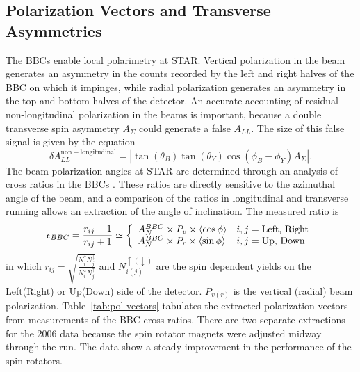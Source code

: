 
\subsection{Polarization Vectors and Transverse Asymmetries}

The BBCs enable local polarimetry at STAR.  Vertical polarization in the beam generates an asymmetry in the counts recorded by the left and right halves of the BBC on which it impinges, while radial polarization generates an asymmetry in the top and bottom halves of the detector.  An accurate accounting of residual non-longitudinal polarization in the beams is important, because a double transverse spin asymmetry \(A_{\Sigma}\) could generate a false \(A_{LL}\).  The size of this false signal is given by the equation
%
\begin{equation}
  \delta A_{LL}^{\mathrm{non-longitudinal}} = | \tan(\theta_B) \tan(\theta_Y) \cos(\phi_B - \phi_Y) A_{\Sigma} |.
  \label{eqn:pol-vector-uncertainty}
\end{equation}
%
The beam polarization angles at STAR are determined through an analysis of cross ratios in the BBCs \cite{Kiryluk:2005gg}.  These ratios are directly sensitive to the azimuthal angle of the beam, and a comparison of the ratios in longitudinal and transverse running allows an extraction of the angle of inclination.  The measured ratio is 
%
\begin{equation}
  \epsilon_{BBC} = \frac{r_{ij} -1}{r_{ij} + 1} \simeq \left\{
  \begin{array}{l l}
    A_N^{BBC} \times P_v \times \langle \cos \phi \rangle & i,j = \mbox{Left, Right} \\
    A_N^{BBC} \times P_r \times \langle \sin \phi \rangle & i,j = \mbox{Up, Down} \\
  \end{array} \right.
\end{equation}
%
in which \(r_{ij} = \sqrt{\frac{N_i^{\uparrow} N_j^{\downarrow}}{N_i^{\downarrow} N_j^{\uparrow}}}\) and \(N_{i(j)}^{\uparrow(\downarrow)}\) are the spin dependent yields on the Left(Right) or Up(Down) side of the detector. \(P_{v(r)}\) is the vertical (radial) beam polarization.  Table~\ref{tab:pol-vectors} tabulates the extracted polarization vectors from measurements of the BBC cross-ratios.  There are two separate extractions for the 2006 data because the spin rotator magnets were adjusted midway through the run.  The data show a steady improvement in the performance of the spin rotators.


